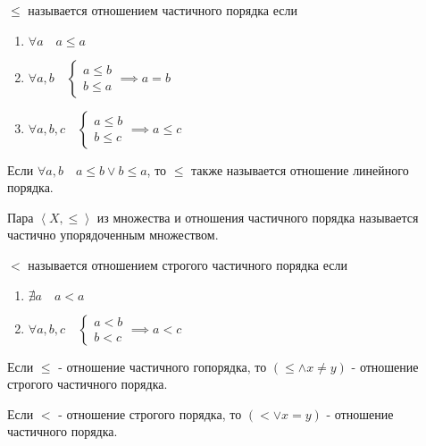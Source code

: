\begin{definition} \thmslashn 

    $\le$ называется отношением частичного порядка если
    \begin{enumerate}
        \item $\forall{a}\quad a \le a$
        \item $\forall{a, b}\quad \begin{cases}
            a \le b\\
            b \le a
        \end{cases} \implies a = b$
        \item $\forall{a, b, c}\quad \begin{cases}
            a \le b\\
            b \le c
        \end{cases} \implies a \le c$ 
    \end{enumerate}

    Если $\forall{a, b}\quad a \le b \lor b \le a$, то $\le$ также называется отношение линейного порядка. 
\end{definition}
\begin{definition} \thmslashn 

    Пара $\left<X, \le \right>$ из множества и отношения частичного порядка называется частично упорядоченным множеством.
\end{definition}
\begin{definition} \thmslashn 

    $<$ называется отношением строгого частичного порядка если
    \begin{enumerate}
        \item $\nexists{a}\quad a < a$
        \item $\forall{a, b, c}\quad \begin{cases}
            a < b\\
            b < c
        \end{cases} \implies a < c$ 
    \end{enumerate}
\end{definition}
\begin{lemma} \thmslashn

    Если $\le$ - отношение частичного гопорядка, то $(\le \land x \neq y)$ - отношение строгого частичного порядка.

    Если $<$ - отношение строгого порядка, то $\left(< \lor x = y \right) $ - отношение частичного порядка.
\end{lemma}

